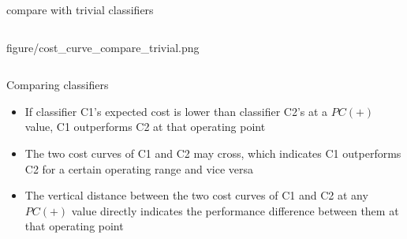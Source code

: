 \documentclass[11pt,compress,t,notes=noshow, xcolor=table]{beamer}
\begin{document}
\begin{vbframe}{compare with trivial classifiers}
\begin{columns}[T]
\begin{column}{0.39\textwidth}
      {figure/cost_curve_compare_trivial.png}
\end{column}
\end{columns}


\end{vbframe}


\begin{vbframe}{Comparing classifiers}
  \begin{itemize}
    \item If classifier C1's expected cost is lower than classifier C2's at a $PC(+)$ value, C1 outperforms C2 at that operating point
    \item The two cost curves of C1 and C2 may cross, which indicates C1 outperforms C2 for a certain operating range and vice versa
    \item The vertical distance between the two cost curves of C1 and C2 at any $PC(+)$ value directly indicates the performance difference between them at that operating point
  \end{itemize}



\end{vbframe}
\end{document}
